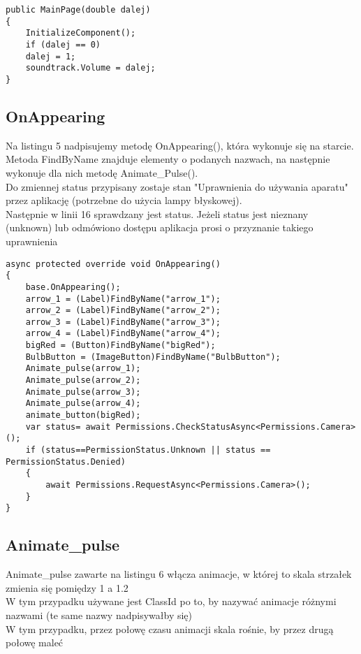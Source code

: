 \begin{lstlisting}[caption=MainPage]
public MainPage(double dalej)
{
	InitializeComponent();
	if (dalej == 0)
	dalej = 1;
	soundtrack.Volume = dalej;
}
\end{lstlisting}

\subsection{OnAppearing}
\hspace{0.60cm}Na listingu 5 nadpisujemy metodę OnAppearing(), która wykonuje się na starcie.
\\
Metoda FindByName znajduje elementy o podanych nazwach, na następnie wykonuje dla nich metodę Animate\_Pulse().
\\
Do zmiennej status przypisany zostaje stan "Uprawnienia do używania aparatu" przez aplikację (potrzebne do użycia lampy błyskowej).
\\
Następnie w linii 16 sprawdzany jest status. Jeżeli status jest nieznany (unknown) lub odmówiono dostępu aplikacja prosi o przyznanie takiego uprawnienia

\begin{lstlisting}[caption=OnAppearing]
async protected override void OnAppearing()
{
	base.OnAppearing();
	arrow_1 = (Label)FindByName("arrow_1");
	arrow_2 = (Label)FindByName("arrow_2");
	arrow_3 = (Label)FindByName("arrow_3");
	arrow_4 = (Label)FindByName("arrow_4");
	bigRed = (Button)FindByName("bigRed");
	BulbButton = (ImageButton)FindByName("BulbButton");
	Animate_pulse(arrow_1);
	Animate_pulse(arrow_2);
	Animate_pulse(arrow_3);
	Animate_pulse(arrow_4);
	animate_button(bigRed);
	var status= await Permissions.CheckStatusAsync<Permissions.Camera>();
	if (status==PermissionStatus.Unknown || status == PermissionStatus.Denied)
	{
		await Permissions.RequestAsync<Permissions.Camera>();
	}
}
\end{lstlisting}

\subsection{Animate\_pulse}
\hspace{0.60cm}Animate\_pulse zawarte na listingu 6 włącza animacje, w której to skala strzałek zmienia się pomiędzy 1 a 1.2
\\
W tym przypadku używane jest ClassId po to, by nazywać animacje różnymi nazwami (te same nazwy nadpisywałby się)
\\
W tym przypadku, przez połowę czasu animacji skala rośnie, by przez drugą połowę maleć

